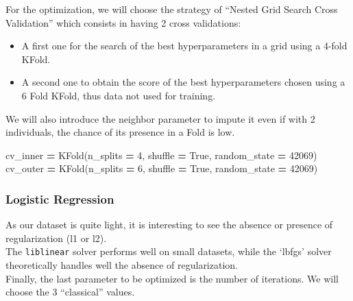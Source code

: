 \documentclass[
]{article}
\newenvironment{Shaded}{\begin{snugshade}}{\end{snugshade}}
\newcommand{\DecValTok}[1]{\textcolor[rgb]{0.00,0.00,0.81}{#1}}
\newcommand{\NormalTok}[1]{#1}
\newcommand{\OperatorTok}[1]{\textcolor[rgb]{0.81,0.36,0.00}{\textbf{#1}}}
\newcommand{\VariableTok}[1]{\textcolor[rgb]{0.00,0.00,0.00}{#1}}
\providecommand{\tightlist}{%
  \setlength{\itemsep}{0pt}\setlength{\parskip}{0pt}}
\begin{document}
For the optimization, we will choose the strategy of ``Nested Grid
Search Cross Validation'' which consists in having 2 cross validations:

\begin{itemize}
\tightlist
\item
  A first one for the search of the best hyperparameters in a grid using
  a 4-fold KFold.
\item
  A second one to obtain the score of the best hyperparameters chosen
  using a 6 Fold KFold, thus data not used for training.
\end{itemize}

We will also introduce the neighbor parameter to impute it even if with
2 individuals, the chance of its presence in a Fold is low.

\begin{Shaded}
\begin{Highlighting}[]
\NormalTok{cv\_inner }\OperatorTok{=}\NormalTok{ KFold(n\_splits }\OperatorTok{=} \DecValTok{4}\NormalTok{, shuffle }\OperatorTok{=} \VariableTok{True}\NormalTok{, random\_state }\OperatorTok{=} \DecValTok{42069}\NormalTok{)}
\NormalTok{cv\_outer }\OperatorTok{=}\NormalTok{ KFold(n\_splits }\OperatorTok{=} \DecValTok{6}\NormalTok{, shuffle }\OperatorTok{=} \VariableTok{True}\NormalTok{, random\_state }\OperatorTok{=} \DecValTok{42069}\NormalTok{)}
\end{Highlighting}
\end{Shaded}

\hypertarget{logistic-regression}{%
\subsubsection{Logistic Regression}\label{logistic-regression}}

As our dataset is quite light, it is interesting to see the absence or
presence of regularization (l1 or l2).\\
The \texttt{liblinear} solver performs well on small datasets, while the
`lbfgs' solver theoretically handles well the absence of
regularization.\\
Finally, the last parameter to be optimized is the number of iterations.
We will choose the 3 ``classical'' values.
\end{document}
